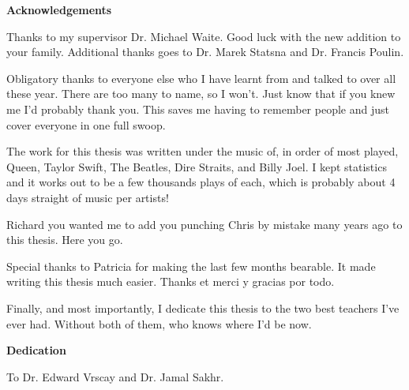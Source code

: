 
\begin{center}\textbf{Acknowledgements}\end{center}
Thanks to my supervisor Dr. Michael Waite. Good luck with the new addition to your family. Additional thanks goes to Dr. Marek Statsna and Dr. Francis Poulin. 

Obligatory thanks to everyone else who I have learnt from and talked to over all these year. There are too many to name, so I won't. Just know that if you knew me I'd probably thank you. This saves me having to remember people and just cover everyone in one full swoop.

The work for this thesis was written under the music of, in order of most played, Queen, Taylor Swift, The Beatles, Dire Straits, and Billy Joel. I kept statistics and it works out to be a few thousands plays of each, which is probably about 4 days straight of music per artists!

Richard you wanted me to add you punching Chris by mistake many years ago to this thesis. Here you go.

Special thanks to Patricia for making the last few months bearable. It made writing this thesis much easier. Thanks et merci y gracias por todo. 

Finally, and most importantly, I dedicate this thesis to the two best teachers I've ever had. Without both of them, who knows where I'd be now. 
\cleardoublepage


\begin{center}\textbf{Dedication}\end{center}
\begin{center}To Dr. Edward Vrscay and Dr. Jamal Sakhr.\end{center}
\cleardoublepage


\renewcommand\contentsname{Table of Contents}
\tableofcontents
\cleardoublepage
{}

\listoftables
\cleardoublepage
{}		%

\listoffigures
\cleardoublepage
{}		%



